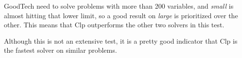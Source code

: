 GoodTech need to solve problems with more than 200 variables, and
\textit{small} is almost hitting that lower limit, so a good result on
\textit{large} is prioritized over the other.
This means that Clp outperforms the other two solvers in this test.

Although this is not an extensive test, it is a pretty good indicator that Clp
is the fastest solver on similar problems.
